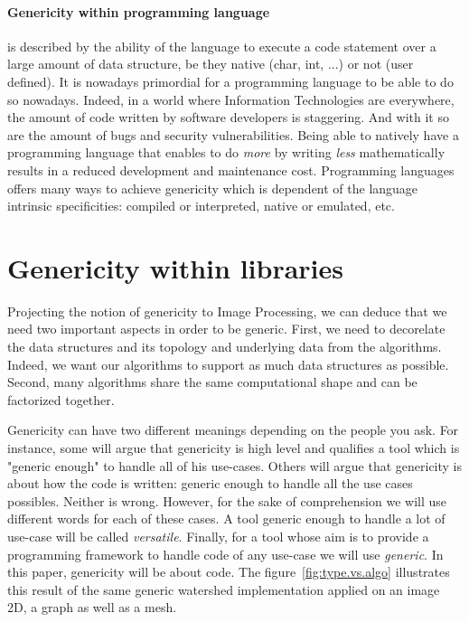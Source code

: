 \paragraph{Genericity within programming language} is described by the ability of the language to execute a code
statement over a large amount of data structure, be they native (char, int, ...) or not (user defined). It is nowadays
primordial for a programming language to be able to do so nowadays. Indeed, in a world where Information Technologies
are everywhere, the amount of code written by software developers is staggering. And with it so are the amount of bugs
and security vulnerabilities. Being able to natively have a programming language that enables to do \emph{more} by
writing \emph{less} mathematically results in a reduced development and maintenance cost. Programming languages offers
many ways to achieve genericity which is dependent of the language intrinsic specificities: compiled or interpreted,
native or emulated, etc.


\section{Genericity within libraries}
\label{sec:gen.within.libraries}

Projecting the notion of genericity to Image Processing, we can deduce that we need two important aspects in order to be
generic. First, we need to decorelate the data structures and its topology and underlying data from the algorithms.
Indeed, we want our algorithms to support as much data structures as possible. Second, many algorithms share the same
computational shape and can be factorized together.

Genericity can have two different meanings depending on the people you ask. For instance, some will argue that
genericity is high level and qualifies a tool which is "generic enough" to handle all of his use-cases. Others will
argue that genericity is about how the code is written: generic enough to handle all the use cases possibles. Neither is
wrong. However, for the sake of comprehension we will use different words for each of these cases. A tool generic enough
to handle a lot of use-case will be called \emph{versatile}. Finally, for a tool whose aim is to provide a programming
framework to handle code of any use-case we will use \emph{generic}. In this paper, genericity will be about code. The
figure~\ref{fig:type.vs.algo} illustrates this result of the same generic watershed implementation applied on an image
2D, a graph as well as a mesh.

